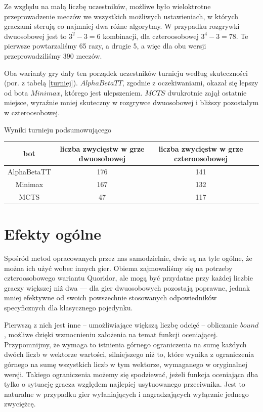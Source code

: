 \documentclass{pracamgr}
\begin{document}
Ze względu na małą liczbę uczestników, możliwe było wieloktrotne przeprowadzenie meczów we wszystkich możliwych ustawieniach, w których graczami sterują co najmniej dwa różne algorytmy.
W przypadku rozgrywki dwuosobowej jest to \(3^2 - 3 = 6\) kombinacji, dla czteroosobowej \(3^4 - 3 = 78\).
Te pierwsze powtarzaliśmy 65 razy, a drugie 5, a więc dla obu wersji przeprowadziliśmy 390 meczów.

Oba warianty gry dały ten porządek uczestników turnieju według skuteczności (por. z tabelą \ref{turniej}).
\(AlphaBetaTT\), zgodnie z oczekiwaniami, okazał się lepszy od bota \(Minimax\), którego jest ulepszeniem.
\(MCTS\) dwukrotnie zajął ostatnie miejsce, wyraźnie mniej skuteczny w rozgrywce dwuosobowej i bliższy pozostałym w czteroosobowej.

\begin{tabela}
    \caption{Wyniki turnieju podsumowującego \label{turniej}}
    \begin{tabular}{| c | c | c | c |}
	\hline
        bot & liczba zwycięstw w grze dwuosobowej & liczba zwycięstw w grze czteroosobowej \\ \hline
	\hline
        AlphaBetaTT & 176 & 141 \\ \hline
        Minimax & 167 & 132 \\ \hline
        MCTS & 47 & 117 \\ \hline
    \end{tabular}
\end{tabela}

\section{Efekty ogólne}

Spośród metod opracowanych przez nas samodzielnie, dwie są na tyle ogólne, że można ich użyć wobec innych gier.
Obiema zajmowaliśmy się na potrzeby czteroosobowego wariantu Quoridor, ale mogą być przydatne przy każdej liczbie graczy większej niż dwa --- dla gier dwuosobowych pozostają poprawne, jednak mniej efektywne od swoich powszechnie stosowanych odpowiedników specyficznych dla klasycznego pojedynku.

Pierwszą z nich jest inne -- umożliwiające większą liczbę odcięć -- obliczanie \(bound\), możliwe dzięki wzmocnieniu założenia na temat funkcji oceniającej.
Przypomnijmy, że wymaga to istnienia górnego ograniczenia na sumę każdych dwóch liczb w wektorze wartości, silniejszego niż to, które wynika z ograniczenia górnego na sumę wszystkich liczb w tym wektorze, wymaganego w oryginalnej wersji.
Takiego ograniczenia możemy się spodziewać, jeżeli funkcja oceniająca dba tylko o sytuację gracza względem najlepiej usytuowanego przeciwnika.
Jest to naturalne w przypadku gier wyłaniających i nagradzających wyłącznie jednego zwyciężcę.
\end{document}
